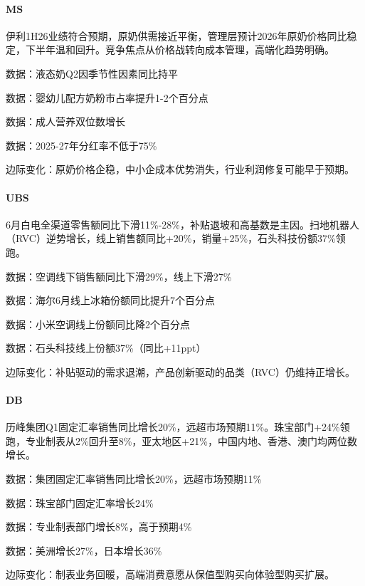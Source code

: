 \documentclass[11pt]{ctexart}
\begin{document}
\paragraph{MS} 伊利1H26业绩符合预期，原奶供需接近平衡，管理层预计2026年原奶价格同比稳定，下半年温和回升。竞争焦点从价格战转向成本管理，高端化趋势明确。
{\small\color{refgray}数据：液态奶Q2因季节性因素同比持平\par}
{\small\color{refgray}数据：婴幼儿配方奶粉市占率提升1-2个百分点\par}
{\small\color{refgray}数据：成人营养双位数增长\par}
{\small\color{refgray}数据：2025-27年分红率不低于75\%\par}
{\small\color{refgray}边际变化：原奶价格企稳，中小企成本优势消失，行业利润修复可能早于预期。\par}
\paragraph{UBS} 6月白电全渠道零售额同比下滑11\%-28\%，补贴退坡和高基数是主因。扫地机器人（RVC）逆势增长，线上销售额同比+20\%，销量+25\%，石头科技份额37\%领跑。
{\small\color{refgray}数据：空调线下销售额同比下滑29\%，线上下滑27\%\par}
{\small\color{refgray}数据：海尔6月线上冰箱份额同比提升7个百分点\par}
{\small\color{refgray}数据：小米空调线上份额同比降2个百分点\par}
{\small\color{refgray}数据：石头科技线上份额37\%（同比+11ppt）\par}
{\small\color{refgray}边际变化：补贴驱动的需求退潮，产品创新驱动的品类（RVC）仍维持正增长。\par}
\paragraph{DB} 历峰集团Q1固定汇率销售同比增长20\%，远超市场预期11\%。珠宝部门+24\%领跑，专业制表从2\%回升至8\%，亚太地区+21\%，中国内地、香港、澳门均两位数增长。
{\small\color{refgray}数据：集团固定汇率销售同比增长20\%，远超市场预期11\%\par}
{\small\color{refgray}数据：珠宝部门固定汇率增长24\%\par}
{\small\color{refgray}数据：专业制表部门增长8\%，高于预期4\%\par}
{\small\color{refgray}数据：美洲增长27\%，日本增长36\%\par}
{\small\color{refgray}边际变化：制表业务回暖，高端消费意愿从保值型购买向体验型购买扩展。\par}
\end{document}
